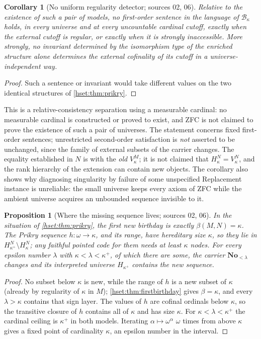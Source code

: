 \documentclass[11pt,letterpaper]{article}
\newtheorem{proposition}[proposition]{Proposition}\aliascntresetthe{proposition}
\newtheorem{corollary}[corollary]{Corollary}\aliascntresetthe{corollary}
\theoremstyle{definition}
\theoremstyle{remark}
\newcommand{\No}{\mathbf{No}}
\newcommand{\B}{\mathcal B}
\begin{document}
\begin{corollary}[No uniform regularity detector; sources 02, 06]
\label{hset:cor:prikry}
Relative to the existence of such a pair of models, no first-order sentence in
the language of $\B_\kappa$ holds, in every universe and at every uncountable
cardinal cutoff, exactly when the external cutoff is regular, or exactly when it
is strongly inaccessible. More strongly, no invariant determined by the
isomorphism type of the enriched structure alone determines the external
cofinality of its cutoff in a universe-independent way.
\end{corollary}
\begin{proof}
Such a sentence or invariant would take different values on the two identical
structures of \cref{hset:thm:prikry}.
\end{proof}

This is a relative-consistency separation using a measurable cardinal: no
measurable cardinal is constructed or proved to exist, and ZFC is not claimed to
prove the existence of such a pair of universes. The statement concerns fixed
first-order sentences; unrestricted second-order satisfaction is \emph{not}
asserted to be unchanged, since the family of external subsets of the carrier
changes. The equality established in $N$ is with the \emph{old} $V_\kappa^M$;
it is not claimed that $H_\kappa^N=V_\kappa^N$, and the rank hierarchy of the
extension can contain new objects. The corollary also shows why diagnosing
singularity by failure of some unspecified Replacement instance is unreliable:
the small universe keeps every axiom of ZFC while the ambient universe acquires
an unbounded sequence invisible to it.

\begin{proposition}[Where the missing sequence lives; sources 02, 06]
\label{hset:prop:onset}
In the situation of \cref{hset:thm:prikry}, the first new birthday is exactly
$\beta(M,N)=\kappa$. The Prikry sequence $h:\omega\to\kappa$, and its range, have
hereditary size $\kappa$, so they lie in $H_{\kappa^+}^N\setminus H_\kappa^N$; any
faithful pointed code for them needs at least $\kappa$ nodes. For every epsilon
number $\lambda$ with $\kappa<\lambda<\kappa^+$, of which there are some, the
carrier $\No_{<\lambda}$ changes and its interpreted universe $H_{\kappa^+}$
contains the new sequence.
\end{proposition}
\begin{proof}
No subset below $\kappa$ is new, while the range of $h$ is a new subset of
$\kappa$ (already by regularity of $\kappa$ in $M$); \cref{hset:thm:firstbirthday}
gives $\beta=\kappa$, and every $\lambda>\kappa$ contains that sign layer. The
values of $h$ are cofinal ordinals below $\kappa$, so the transitive closure of
$h$ contains all of $\kappa$ and has size $\kappa$. For $\kappa<\lambda<\kappa^+$ the
cardinal ceiling is $\kappa^+$ in both models. Iterating $\alpha\mapsto
\omega^\alpha$ $\omega$ times from above $\kappa$ gives a fixed point of
cardinality $\kappa$, an epsilon number in the interval.
\end{proof}
\end{document}
